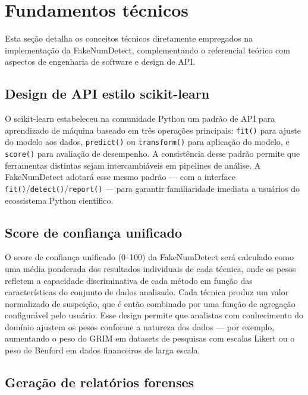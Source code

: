\documentclass[
    12pt,                %
    openright,           %
    oneside,             %
    a4paper,             %
    english,             %
    brazil               %
]{abntex2}
\begin{document}
\section{Fundamentos técnicos}
\label{sec:fundamentos}

Esta seção detalha os conceitos técnicos diretamente empregados na implementação da FakeNumDetect, 
complementando o referencial teórico com aspectos de engenharia de software e design de API.

\subsection{Design de API estilo scikit-learn}

O scikit-learn \cite{Pedregosa2011} estabeleceu na comunidade Python um padrão de API para aprendizado de 
máquina baseado em três operações principais: \texttt{fit()} para ajuste do modelo aos dados, \texttt{predict()} ou \texttt{transform()} para 
aplicação do modelo, e \texttt{score()} para avaliação de desempenho. A consistência desse padrão permite que ferramentas distintas sejam 
intercambiáveis em pipelines de análise. A FakeNumDetect adotará esse mesmo padrão — com a 
interface \texttt{fit()}/\texttt{detect()}/\texttt{report()} — para garantir familiaridade imediata a usuários do ecossistema Python científico.

\subsection{Score de confiança unificado}

O score de confiança unificado (0--100) da FakeNumDetect será calculado como uma média ponderada dos 
resultados individuais de cada técnica, onde os pesos refletem a capacidade discriminativa de cada método em 
função das características do conjunto de dados analisado. Cada técnica produz um valor normalizado de suspeição, 
que é então combinado por uma função de agregação configurável pelo usuário. Esse design permite que analistas com 
conhecimento do domínio ajustem os pesos conforme a natureza dos dados — por exemplo, aumentando o peso do GRIM em 
datasets de pesquisas com escalas Likert ou o peso de Benford em dados financeiros de larga escala.

\subsection{Geração de relatórios forenses}
\end{document}
